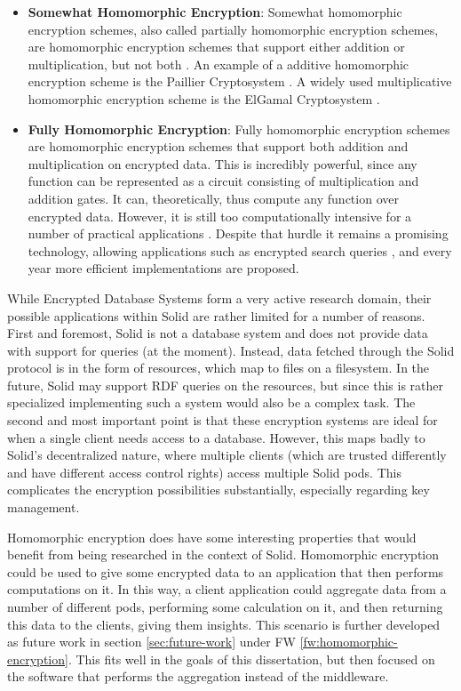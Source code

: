 \begin{itemize}
    \item \textbf{Somewhat Homomorphic Encryption}: Somewhat homomorphic encryption schemes, also called partially homomorphic encryption schemes, are homomorphic encryption schemes that support either addition or multiplication, but not both \citep{she}. An example of a additive homomorphic encryption scheme is the Paillier Cryptosystem \citep{paillier}. A widely used multiplicative homomorphic encryption scheme is the ElGamal Cryptosystem \citep{elgamal}.
    \item \textbf{Fully Homomorphic Encryption}: Fully homomorphic encryption schemes are homomorphic encryption schemes that support both addition and multiplication on encrypted data. This is incredibly powerful, since any function can be represented as a circuit consisting of multiplication and addition gates. It can, theoretically, thus compute any function over encrypted data. However, it is still too computationally intensive for a number of practical applications \citep{he-practical, pragmatic-mpc}. Despite that hurdle it remains a promising technology, allowing applications such as encrypted search queries \citep{fhe}, and every year more efficient implementations are proposed.
\end{itemize}

\noindent While Encrypted Database Systems form a very active research domain, their possible applications within Solid are rather limited for a number of reasons. First and foremost, Solid is not a database system and does not provide data with support for queries (at the moment). Instead, data fetched through the Solid protocol is in the form of resources, which map to files on a filesystem. In the future, Solid may support RDF queries on the resources, but since this is rather specialized implementing such a system would also be a complex task. The second and most important point is that these encryption systems are ideal for when a single client needs access to a database. However, this maps badly to Solid's decentralized nature, where multiple clients (which are trusted differently and have different access control rights) access multiple Solid pods. This complicates the encryption possibilities substantially, especially regarding key management. 

Homomorphic encryption does have some interesting properties that would benefit from being researched in the context of Solid. Homomorphic encryption could be used to give some encrypted data to an application that then performs computations on it. In this way, a client application could aggregate data from a number of different pods, performing some calculation on it, and then returning this data to the clients, giving them insights. This scenario is further developed as future work in section \ref{sec:future-work} under FW \ref{fw:homomorphic-encryption}. This fits well in the goals of this dissertation, but then focused on the software that performs the aggregation instead of the middleware.

